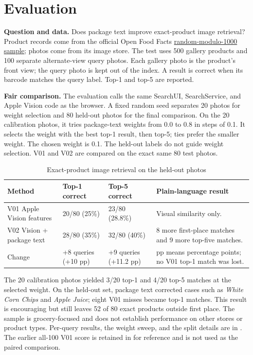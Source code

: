 \documentclass[11pt,a4paper]{article}
\newcommand{\nextsection}[1]{\clearpage\section{#1}}
\begin{document}
\nextsection{Evaluation}
\textbf{Question and data.} Does package text improve exact-product image retrieval? Product records come from the official Open Food Facts \href{https://static.openfoodfacts.org/exports/products.random-modulo-1000.tar.gz}{random-modulo-1000 sample}; photos come from its image store. The test uses 500 gallery products and 100 separate alternate-view query photos. Each gallery photo is the product's front view; the query photo is kept out of the index. A result is correct when its barcode matches the query label. Top-1 and top-5 are reported.

\textbf{Fair comparison.} The evaluation calls the same SearchUI, SearchService, and Apple Vision code as the browser. A fixed random seed separates 20 photos for weight selection and 80 held-out photos for the final comparison. On the 20 calibration photos, it tries package-text weights from 0.0 to 0.8 in steps of 0.1. It selects the weight with the best top-1 result, then top-5; ties prefer the smaller weight. The chosen weight is 0.1. The held-out labels do not guide weight selection. V01 and V02 are compared on the exact same 80 test photos.

\begin{table}[H]\small
\caption{Exact-product image retrieval on the held-out photos}
\begin{tabularx}{\linewidth}{@{}p{42mm}p{40mm}p{35mm}Y@{}}\toprule
Method & Top-1 correct & Top-5 correct & Plain-language result \\ \midrule
V01 Apple Vision features & 20/80 (25\%) & 23/80 (28.8\%) & Visual similarity only. \\
V02 Vision + package text & 28/80 (35\%) & 32/80 (40\%) & 8 more first-place matches and 9 more top-five matches. \\
Change & +8 queries (+10 pp) & +9 queries (+11.2 pp) & pp means percentage points; no V01 top-1 match was lost. \\
\bottomrule\end{tabularx}
\end{table}

The 20 calibration photos yielded 3/20 top-1 and 4/20 top-5 matches at the selected weight. On the held-out set, package text corrected cases such as \emph{White Corn Chips} and \emph{Apple Juice}; eight V01 misses became top-1 matches. This result is encouraging but still leaves 52 of 80 exact products outside first place. The sample is grocery-focused and does not establish performance on other stores or product types. Per-query results, the weight sweep, and the split details are in . The earlier all-100 V01 score is retained in  for reference and is not used as the paired comparison.
\end{document}
